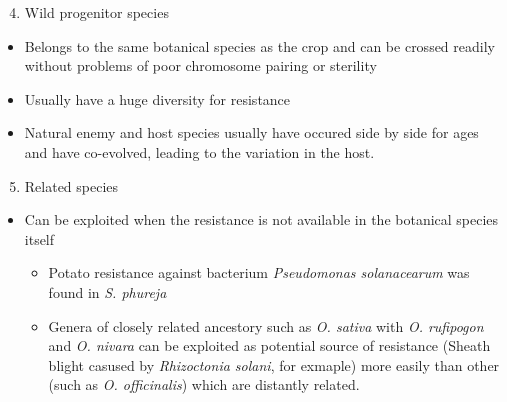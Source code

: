 \documentclass[11pt,dvipsnames,ignorenonframetext,aspectratio=169]{beamer}
\providecommand{\tightlist}{%
  \setlength{\itemsep}{0pt}\setlength{\parskip}{0pt}}
\begin{document}
\begin{frame}{}
\protect\hypertarget{section-1}{}
\begin{enumerate}
\setcounter{enumi}{3}
\tightlist
\item
  Wild progenitor species
\end{enumerate}

\begin{itemize}
\tightlist
\item
  Belongs to the same botanical species as the crop and can be crossed
  readily without problems of poor chromosome pairing or sterility
\item
  Usually have a huge diversity for resistance
\item
  Natural enemy and host species usually have occured side by side for
  ages and have co-evolved, leading to the variation in the host.
\end{itemize}

\begin{enumerate}
\setcounter{enumi}{4}
\tightlist
\item
  Related species
\end{enumerate}

\begin{itemize}
\tightlist
\item
  Can be exploited when the resistance is not available in the botanical
  species itself

  \begin{itemize}
  \tightlist
  \item
    Potato resistance against bacterium \emph{Pseudomonas solanacearum}
    was found in \emph{S. phureja}
  \item
    Genera of closely related ancestory such as \emph{O. sativa} with
    \emph{O. rufipogon} and \emph{O. nivara} can be exploited as
    potential source of resistance (Sheath blight casused by
    \emph{Rhizoctonia solani}, for exmaple) more easily than other (such
    as \emph{O. officinalis}) which are distantly related.
  \end{itemize}
\end{itemize}
\end{frame}
\end{document}
